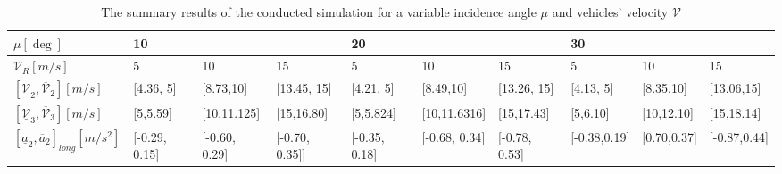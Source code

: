 \begin{enumerate}
\newpage
\thispagestyle{empty}
\begin{landscape}
\begin{table}[!h]
\setlength\tabcolsep{6.5pt} %

\centering
\caption{The summary results of the conducted simulation for a variable incidence angle $\mu$ and vehicles' velocity $\mathcal{V}$ }
  \begin{adjustwidth}{-0.235\textwidth}{-0.10\textwidth}
\label{Tab: Summary}

\begin{tabular}{|l|lll|lll|lll|}
\hline
$\mu[\deg]$                                                       & \multicolumn{3}{l|}{10}                                                                                            & \multicolumn{3}{l|}{20}                                                                                          & \multicolumn{3}{l|}{30}                                                                                     \\ \hline
$\mathcal{V}_{R}[m/s]$                                            & \multicolumn{1}{l|}{5}                     & \multicolumn{1}{l|}{10}                    & 15                       & \multicolumn{1}{l|}{5}                   & \multicolumn{1}{l|}{10}                    & 15                       & \multicolumn{1}{l|}{5}                    & \multicolumn{1}{l|}{10}                  & 15                   \\ \hline
$[\underline{\mathcal{V}}_{2}, \overline{\mathcal{V}}_{2}][m/s]$  & \multicolumn{1}{l|}{{[}4.36, 5{]}}       & \multicolumn{1}{l|}{{[}8.73,10{]}}      & {[}13.45, 15{]}        & \multicolumn{1}{l|}{{[}4.21, 5{]}}     & \multicolumn{1}{l|}{{[}8.49,10{]}}       & {[}13.26, 15{]}        & \multicolumn{1}{l|}{{[}4.13, 5{]}}      & \multicolumn{1}{l|}{{[}8.35,10{]}}     & {[}13.06,15{]}     \\ \hline
$[\underline{\mathcal{V}}_{3}, \overline{\mathcal{V}}_{3}][m/s]$ & \multicolumn{1}{l|}{{[}5,5.59{]}}       & \multicolumn{1}{l|}{{[}10,11.125{]}}      & {[}15,16.80{]}         & \multicolumn{1}{l|}{{[}5,5.824{]}}       & \multicolumn{1}{l|}{{[}10,11.6316{]}}      & {[}15,17.43{]}           & \multicolumn{1}{l|}{{[}5,6.10{]}}       & \multicolumn{1}{l|}{{[}10,12.10{]}}    & {[}15,18.14{]}     \\ \hline
$[\underline{a}_2,\overline{a}_2]_{long}[m/s^2]$                  & \multicolumn{1}{l|}{{[}-0.29, 0.15{]}} & \multicolumn{1}{l|}{{[}-0.60, 0.29{]}} & {[}-0.70, 0.35{]}{]} & \multicolumn{1}{l|}{{[}-0.35, 0.18{]}}  & \multicolumn{1}{l|}{{[}-0.68, 0.34{]}} & {[}-0.78, 0.53{]} & \multicolumn{1}{l|}{{[}-0.38,0.19{]}} & \multicolumn{1}{l|}{{[}0.70,0.37{]}}  & {[}-0.87,0.44{]} \\ \hline

\end{tabular}
\end{adjustwidth}
\end{table}
\end{landscape}
\end{enumerate}
